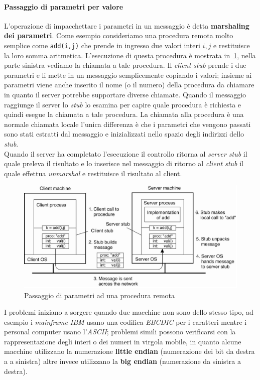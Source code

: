 \paragraph{Passaggio di parametri per valore}
L'operazione di impacchettare i parametri in un messaggio è detta \textbf{marshaling dei parametri}. Come esempio consideriamo una procedura remota molto semplice come \texttt{add(i,j)} che prende in ingresso due valori interi $i,j$ e restituisce la loro somma aritmetica. L'esecuzione di questa procedura è mostrata in \figurename\,\ref{img:marshal}, nella parte sinistra vediamo la chiamata a tale procedura. Il \emph{client stub} prende i due parametri e li mette in un messaggio semplicemente copiando i valori; insieme ai parametri viene anche inserito il nome (o il numero) della procedura da chiamare in quanto il server potrebbe supportare diverse chiamate. Quando il messaggio raggiunge il server lo \emph{stub} lo esamina per capire quale procedura è richiesta e quindi esegue la chiamata a tale procedura. La chiamata alla procedura è una normale chiamata locale l'unica differenza è che i parametri che vengono passati sono stati estratti dal messaggio e inizializzati nello spazio degli indirizzi dello \emph{stub}.\\
Quando il server ha completato l'esecuzione il controllo ritorna al \emph{server stub} il quale preleva il risultato e lo inserisce nel messaggio di ritorno al \emph{client stub} il quale effettua \emph{unmarshal} e restituisce il risultato al client.\\
\begin{figure}
\centering
\includegraphics[scale=0.35]{img/rpcparam.png}
\caption{Passaggio di parametri ad una procedura remota}\label{img:marshal}
\end{figure}
I problemi iniziano a sorgere quando due macchine non sono dello stesso tipo, ad esempio i \emph{mainframe IBM} usano una codifica \emph{EBCDIC} per i caratteri mentre i personal computer usano l'\emph{ASCII}; problemi simili possono verificarsi con la rappresentazione degli interi o dei numeri in virgola mobile, in quanto alcune macchine utilizzano la numerazione \textbf{little endian} (numerazione dei bit da destra a a sinistra) altre invece utilizzano la \textbf{big endian} (numerazione da sinistra a destra).
